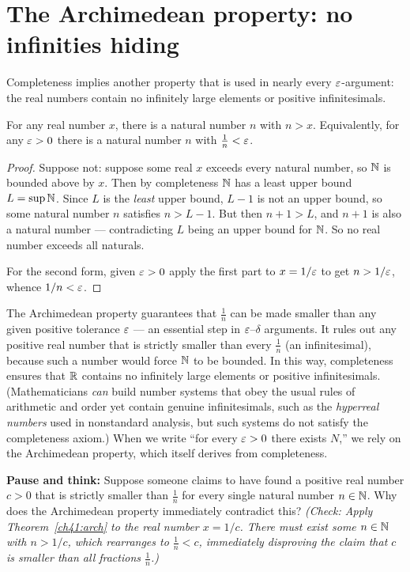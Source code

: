 \section{The Archimedean property: no infinities hiding}
\label{ch41:archimedean}

Completeness implies another property that is used in nearly every $\varepsilon$-argument: the
real numbers contain no infinitely large elements or positive infinitesimals.

\begin{theorem}
\label{ch41:arch}
For any real number $x$, there is a natural number $n$ with $n > x$. Equivalently, for any
$\varepsilon>0$ there is a natural number $n$ with $\frac1n < \varepsilon$.
\end{theorem}

\begin{proof}
Suppose not: suppose some real $x$ exceeds every natural number, so $\mathbb{N}$ is bounded above
by $x$. Then by completeness $\mathbb{N}$ has a least upper bound $L=\sup\mathbb{N}$. Since $L$ is the
\emph{least} upper bound, $L-1$ is not an upper bound, so some natural number $n$ satisfies
$n > L-1$. But then $n+1 > L$, and $n+1$ is also a natural number --- contradicting $L$
being an upper bound for $\mathbb{N}$. So no real number exceeds all naturals.

For the second form, given $\varepsilon>0$ apply the first part to $x=1/\varepsilon$ to get $n>1/\varepsilon$,
whence $1/n<\varepsilon$.
\end{proof}

\begin{happeningbox}
The Archimedean property guarantees that $\frac1n$ can be made smaller than any given positive
tolerance $\varepsilon$ --- an essential step in $\varepsilon$--$\delta$ arguments. It rules
out any positive real number that is strictly smaller than every $\frac1n$ (an infinitesimal),
because such a number would force $\mathbb{N}$ to be bounded. In this way, completeness ensures that
$\mathbb{R}$ contains no infinitely large elements or positive infinitesimals. (Mathematicians
\emph{can} build number systems that obey the usual rules of arithmetic and order yet contain
genuine infinitesimals, such as the \emph{hyperreal numbers} used in nonstandard analysis, but
such systems do not satisfy the completeness axiom.)
When we write ``for every $\varepsilon>0$ there exists $N$,'' we rely on the Archimedean property,
which itself derives from completeness.
\end{happeningbox}

\begin{recoverybox}
\textbf{Pause and think:} Suppose someone claims to have found a positive real number $c > 0$ that is strictly smaller than $\frac{1}{n}$ for every single natural number $n \in \mathbb{N}$. Why does the Archimedean property immediately contradict this?
\emph{(Check: Apply Theorem~\ref{ch41:arch} to the real number $x = 1/c$. There must exist some $n \in \mathbb{N}$ with $n > 1/c$, which rearranges to $\frac{1}{n} < c$, immediately disproving the claim that $c$ is smaller than all fractions $\frac{1}{n}$.)}
\end{recoverybox}


